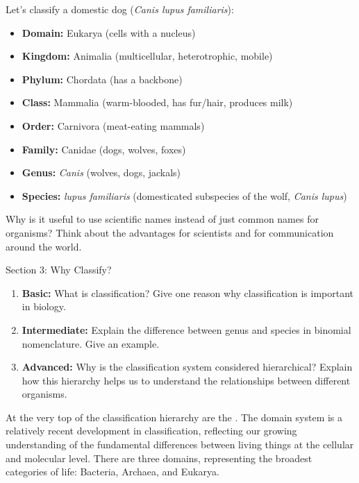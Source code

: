 \begin{example}
Let's classify a domestic dog (\textit{Canis lupus familiaris}):

\begin{itemize}
    \item \textbf{Domain:} Eukarya (cells with a nucleus)
    \item \textbf{Kingdom:} Animalia (multicellular, heterotrophic, mobile)
    \item \textbf{Phylum:} Chordata (has a backbone)
    \item \textbf{Class:} Mammalia (warm-blooded, has fur/hair, produces milk)
    \item \textbf{Order:} Carnivora (meat-eating mammals)
    \item \textbf{Family:} Canidae (dogs, wolves, foxes)
    \item \textbf{Genus:} \textit{Canis} (wolves, dogs, jackals)
    \item \textbf{Species:} \textit{lupus familiaris} (domesticated subspecies of the wolf, \textit{Canis lupus})
\end{itemize}
\end{example}

\begin{stopandthink}
Why is it useful to use scientific names instead of just common names for organisms? Think about the advantages for scientists and for communication around the world.
\end{stopandthink}


\begin{tieredquestions}{Section 3: Why Classify?}
\begin{enumerate}
    \item \textbf{Basic:} What is classification?  Give one reason why classification is important in biology.
    \item \textbf{Intermediate:} Explain the difference between genus and species in binomial nomenclature.  Give an example.
    \item \textbf{Advanced:}  Why is the classification system considered hierarchical? Explain how this hierarchy helps us to understand the relationships between different organisms.
\end{enumerate}
\end{tieredquestions}


\FloatBarrier
\1

At the very top of the classification hierarchy are the .  The domain system is a relatively recent development in classification, reflecting our growing understanding of the fundamental differences between living things at the cellular and molecular level.  There are three domains, representing the broadest categories of life: Bacteria, Archaea, and Eukarya.

